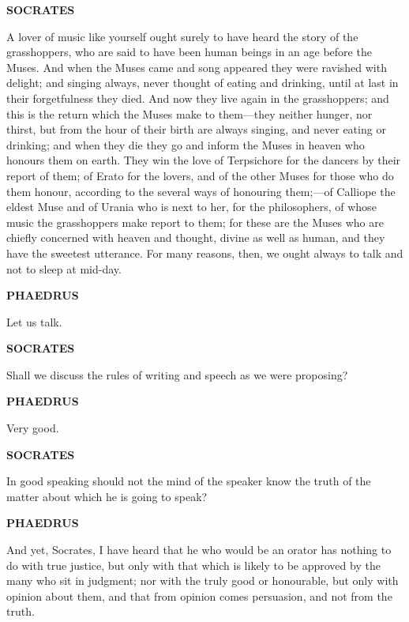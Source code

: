 \documentclass[11pt,letter]{article}
\begin{document}
\par \textbf{SOCRATES}
\par   A lover of music like yourself ought surely to have heard the story of the grasshoppers, who are said to have been human beings in an age before the Muses. And when the Muses came and song appeared they were ravished with delight; and singing always, never thought of eating and drinking, until at last in their forgetfulness they died. And now they live again in the grasshoppers; and this is the return which the Muses make to them—they neither hunger, nor thirst, but from the hour of their birth are always singing, and never eating or drinking; and when they die they go and inform the Muses in heaven who honours them on earth. They win the love of Terpsichore for the dancers by their report of them; of Erato for the lovers, and of the other Muses for those who do them honour, according to the several ways of honouring them;—of Calliope the eldest Muse and of Urania who is next to her, for the philosophers, of whose music the grasshoppers make report to them; for these are the Muses who are chiefly concerned with heaven and thought, divine as well as human, and they have the sweetest utterance. For many reasons, then, we ought always to talk and not to sleep at mid-day.

\par \textbf{PHAEDRUS}
\par   Let us talk.

\par \textbf{SOCRATES}
\par   Shall we discuss the rules of writing and speech as we were proposing?

\par \textbf{PHAEDRUS}
\par   Very good.

\par \textbf{SOCRATES}
\par   In good speaking should not the mind of the speaker know the truth of the matter about which he is going to speak?

\par \textbf{PHAEDRUS}
\par   And yet, Socrates, I have heard that he who would be an orator has nothing to do with true justice, but only with that which is likely to be approved by the many who sit in judgment; nor with the truly good or honourable, but only with opinion about them, and that from opinion comes persuasion, and not from the truth.
\end{document}
